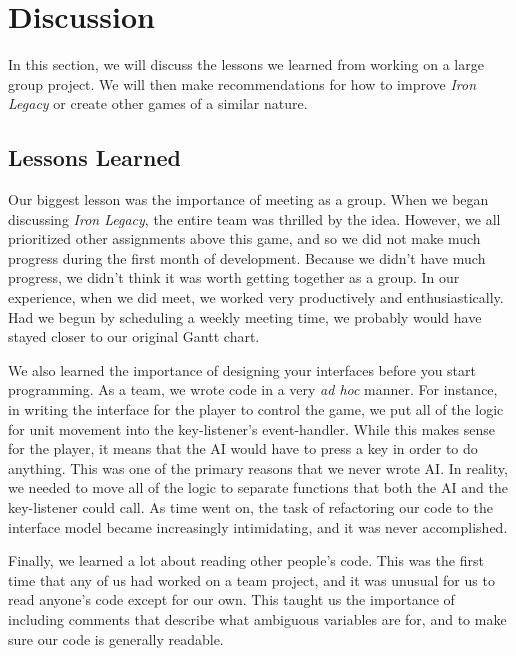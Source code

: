 \documentclass{article}
\begin{document}
\section*{Discussion}

In this section, we will discuss the lessons we learned from working 
    on a large group project.
    We will then make recommendations for how to improve \emph{Iron Legacy}
    or create other games of a similar nature.

\subsection*{Lessons Learned}

Our biggest lesson was the importance of meeting as a group.
    When we began discussing \emph{Iron Legacy}, the entire team was thrilled
    by the idea.
    However, we all prioritized other assignments above this game,
    and so we did not make much progress during the first month of development.
    Because we didn't have much progress, we didn't think it was worth
    getting together as a group.
    In our experience, when we did meet, we worked very productively
    and enthusiastically.
    Had we begun by scheduling a weekly meeting time,
    we probably would have stayed closer to our original Gantt chart.

We also learned the importance of designing your interfaces before you start
    programming.
    As a team, we wrote code in a very \emph{ad hoc} manner.
    For instance, in writing the interface for the player to control the game,
    we put all of the logic for unit movement into the key-listener's
    event-handler.
    While this makes sense for the player, it means that the AI would have
    to press a key in order to do anything.
    This was one of the primary reasons that we never wrote AI.
    In reality, we needed to move all of the logic to separate functions that
    both the AI and the key-listener could call.
    As time went on, the task of refactoring our code to the interface model
    became increasingly intimidating, and it was never accomplished.

Finally, we learned a lot about reading other people's code.
    This was the first time that any of us had worked on a team project,
    and it was unusual for us to read anyone's code except for our own.
    This taught us the importance of including comments that describe what
    ambiguous variables are for, and to make sure our code is generally
    readable.
\end{document}
